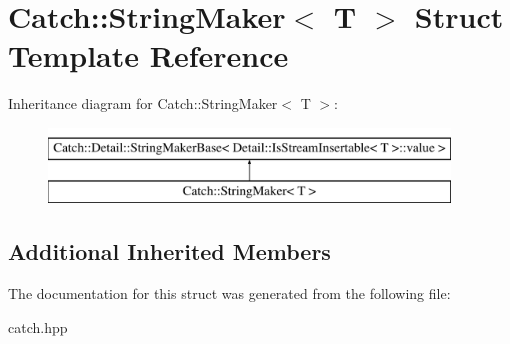 \hypertarget{structCatch_1_1StringMaker}{}\section{Catch\+:\+:String\+Maker$<$ T $>$ Struct Template Reference}
\label{structCatch_1_1StringMaker}
Inheritance diagram for Catch\+:\+:String\+Maker$<$ T $>$\+:\begin{figure}[H]
\begin{center}
\leavevmode
\includegraphics[height=2.000000cm]{structCatch_1_1StringMaker}
\end{center}
\end{figure}
\subsection*{Additional Inherited Members}


The documentation for this struct was generated from the following file\+:\begin{DoxyCompactItemize}
\item 
catch.\+hpp\end{DoxyCompactItemize}
